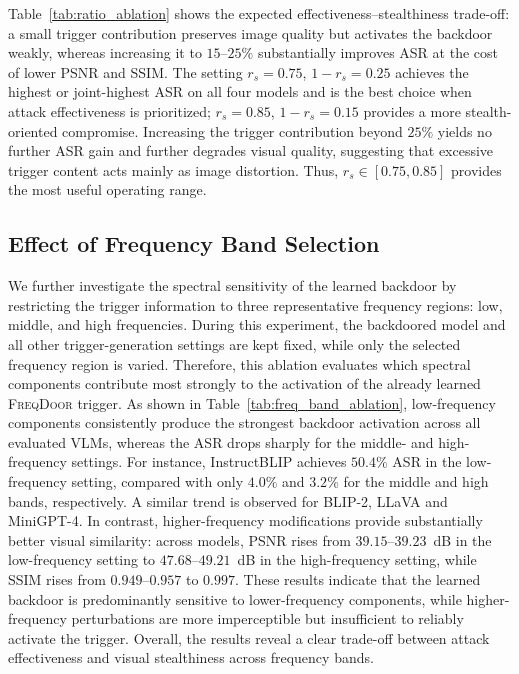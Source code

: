 \documentclass[lettersize,journal]{IEEEtran}
\begin{document}
Table~\ref{tab:ratio_ablation} shows the expected effectiveness--stealthiness trade-off: a small trigger contribution preserves image quality but activates the backdoor weakly, whereas increasing it to $15$--$25\%$ substantially improves ASR at the cost of lower PSNR and SSIM. The setting $r_s=0.75$, $1-r_s=0.25$ achieves the highest or joint-highest ASR on all four models and is the best choice when attack effectiveness is prioritized; $r_s=0.85$, $1-r_s=0.15$ provides a more stealth-oriented compromise. Increasing the trigger contribution beyond $25\%$ yields no further ASR gain and further degrades visual quality, suggesting that excessive trigger content acts mainly as image distortion. Thus, $r_s\in[0.75,0.85]$ provides the most useful operating range.

\subsection{Effect of Frequency Band Selection}
\label{subsec:ablation_band}

We further investigate the spectral sensitivity of the learned backdoor by restricting the trigger information to three representative frequency regions: low, middle, and high frequencies. During this experiment, the backdoored model and all other trigger-generation settings are kept fixed, while only the selected frequency region is varied. Therefore, this ablation evaluates which spectral components contribute most strongly to the activation of the already learned \textsc{FreqDoor} trigger. As shown in Table~\ref{tab:freq_band_ablation}, low-frequency components consistently produce the strongest backdoor activation across all evaluated VLMs, whereas the ASR drops sharply for the middle- and high-frequency settings. For instance, InstructBLIP achieves $50.4\%$ ASR in the low-frequency setting, compared with only $4.0\%$ and $3.2\%$ for the middle and high bands, respectively. A similar trend is observed for BLIP-2, LLaVA and MiniGPT-4. In contrast, higher-frequency modifications provide substantially better visual similarity: across models, PSNR rises from $39.15$--$39.23$~dB in the low-frequency setting to $47.68$--$49.21$~dB in the high-frequency setting, while SSIM rises from $0.949$--$0.957$ to $0.997$. These results indicate that the learned backdoor is predominantly sensitive to lower-frequency components, while higher-frequency perturbations are more imperceptible but insufficient to reliably activate the trigger. Overall, the results reveal a clear trade-off between attack effectiveness and visual stealthiness across frequency bands.
\end{document}
